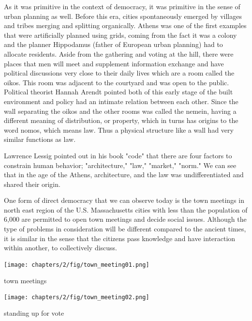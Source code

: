 As it was primitive in the context of democracy, it was primitive in the
sense of urban planning as well. Before this era, cities spontaneously
emerged by villages and tribes merging and splitting organically. Athens
was one of the first examples that were artificially planned using grids,
coming from the fact it was a colony and the planner Hippodamus (father of
European urban planning) had to allocate residents.
Aside from the gathering and voting at the hill, there were places that men
will meet and supplement information exchange and have political
discussions very close to their daily lives which are a room called the
oikos. This room was adjacent to the courtyard and was open to the public.
Political theorist Hannah Arendt pointed both of this early stage of the
built environment and policy had an intimate relation between each other.
Since the wall separating the oikos and the other rooms was called the
nemein, having a different meaning of distribution, or property, which in
turns has origins to the word nomos, which means law. Thus a physical
structure like a wall had very similar functions as law. 

Lawrence Lessig pointed out in his book "code" that there are four factors
to constrain human behavior; "architecture," "law," "market," "norm."
\cite{lessig2009code} We can see that in the age of the Athens, architecture, and the law was undifferentiated and shared their origin. 

One form of direct democracy that we can observe today is the town meetings
in north east region of the U.S. Massachusetts cities with less than the
population of 6,000 are permitted to open town meetings and decide social
issues. Although the type of problems in consideration will be different
compared to the ancient times, it is similar in the sense that the citizens
pass knowledge and have interaction within another, to collectively
discuss.

\begin{marginfigure}[{-20cm}]
  \texttt{[image: chapters/2/fig/town\_meeting01.png]}               
  \caption[town meetings: moderator]{town meetings}
  \label{fig:town_meeting}
\end{marginfigure}

\begin{marginfigure}[{-10cm}]
  \texttt{[image: chapters/2/fig/town\_meeting02.png]}               
  \caption[town meetings: voting]{standing up for vote}
  \label{fig:spin_margin}
\end{marginfigure}


